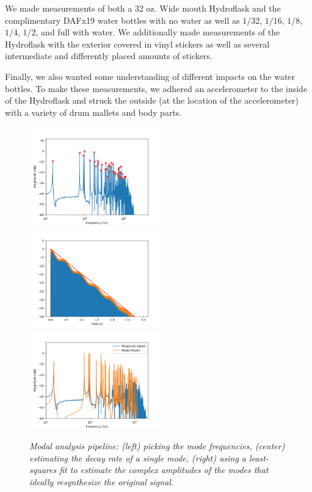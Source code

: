 \documentclass[twoside,a4paper]{article}
\begin{document}
We made measurements of both a 32 oz. Wide mouth Hydroflask and the complimentary DAFx19 water bottles with no water as well as $1/32$, $1/16$, $1/8$, $1/4$, $1/2$, and full with water. We additionally made measurements of the Hydroflask with the exterior covered in vinyl stickers as well as several intermediate and differently placed amounts of stickers. 

Finally, we also wanted some understanding of different impacts on the water bottles. To make these measurements, we adhered an accelerometer to the inside of the Hydroflask and struck the outside (at the location of the accelerometer) with a variety of drum mallets and body parts.  



%
%


\begin{figure}
    \centering
    \includegraphics[width=2.25in]{../Figures/ModePick_ex}
    \includegraphics[width=2.25in]{../Figures/DecayFit_ex}
    \includegraphics[width=2.25in]{../Figures/Model_ex}
    \caption{\it{Modal analysis pipeline: (left) picking the mode frequencies,
    (center) estimating the decay rate of a single mode,
    (right) using a least-squares fit to estimate the complex
    amplitudes of the modes that ideally resynthesize the
    original signal.}}
    \label{fig:modal_analysis}
\end{figure}
\end{document}
